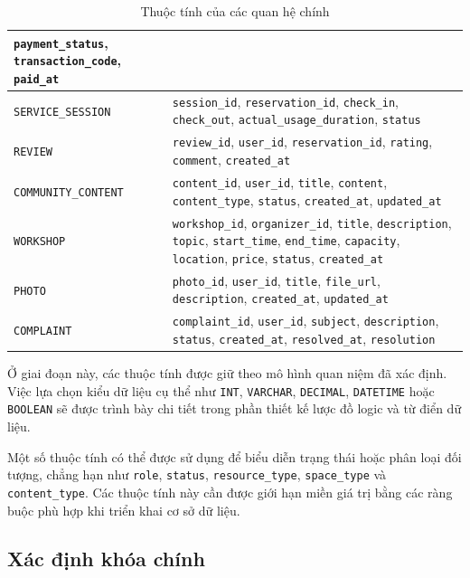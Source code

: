 \begin{table}[htbp]
\begin{tabular}{|p{.20\linewidth}|p{.75\linewidth}|}
\texttt{payment\_status}, \texttt{transaction\_code}, \texttt{paid\_at} \\
\hline
\texttt{SERVICE\_SESSION} &
\texttt{session\_id}, \texttt{reservation\_id}, \texttt{check\_in}, \texttt{check\_out},
\texttt{actual\_usage\_duration}, \texttt{status} \\
\hline
\texttt{REVIEW} &
\texttt{review\_id}, \texttt{user\_id}, \texttt{reservation\_id}, \texttt{rating},
\texttt{comment}, \texttt{created\_at} \\
\hline
\texttt{COMMUNITY\_CONTENT} &
\texttt{content\_id}, \texttt{user\_id}, \texttt{title}, \texttt{content},
\texttt{content\_type}, \texttt{status}, \texttt{created\_at}, \texttt{updated\_at} \\
\hline
\texttt{WORKSHOP} &
\texttt{workshop\_id}, \texttt{organizer\_id}, \texttt{title}, \texttt{description},
\texttt{topic}, \texttt{start\_time}, \texttt{end\_time}, \texttt{capacity},
\texttt{location}, \texttt{price}, \texttt{status}, \texttt{created\_at} \\
\hline
\texttt{PHOTO} &
\texttt{photo\_id}, \texttt{user\_id}, \texttt{title}, \texttt{file\_url},
\texttt{description}, \texttt{created\_at}, \texttt{updated\_at} \\
\hline
\texttt{COMPLAINT} &
\texttt{complaint\_id}, \texttt{user\_id}, \texttt{subject}, \texttt{description},
\texttt{status}, \texttt{created\_at}, \texttt{resolved\_at}, \texttt{resolution} \\
\hline
\end{tabular}
\caption{Thuộc tính của các quan hệ chính}
\end{table}

Ở giai đoạn này, các thuộc tính được giữ theo mô hình quan niệm đã xác định. Việc lựa chọn kiểu dữ liệu cụ thể như \texttt{INT}, \texttt{VARCHAR}, \texttt{DECIMAL}, \texttt{DATETIME} hoặc \texttt{BOOLEAN} sẽ được trình bày chi tiết trong phần thiết kế lược đồ logic và từ điển dữ liệu.

Một số thuộc tính có thể được sử dụng để biểu diễn trạng thái hoặc phân loại đối tượng, chẳng hạn như \texttt{role}, \texttt{status}, \texttt{resource\_type}, \texttt{space\_type} và \texttt{content\_type}. Các thuộc tính này cần được giới hạn miền giá trị bằng các ràng buộc phù hợp khi triển khai cơ sở dữ liệu.

\subsection{Xác định khóa chính}

